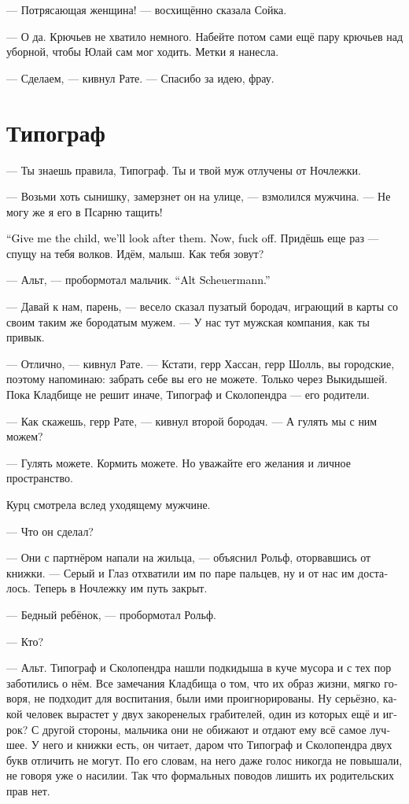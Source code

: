 \documentclass[a4paper,12pt,fleqn]{book}\usepackage{cooltooltips}\usepackage{polyglossia}\setdefaultlanguage[babelshorthands=true]{russian}\setotherlanguage{english}\defaultfontfeatures{Ligatures=TeX,Mapping=tex-text} \usepackage{xcolor}\definecolor{lightgray}{HTML}{bbbbbb}\color{lightgray}\newcommand{\ml}[3]{\textenglish{\textcolor{black}{#3}}}
\begin{document}
--- Потрясающая женщина! --- восхищённо сказала Сойка.

--- О да.
Крючьев не хватило немного.
Набейте потом сами ещё пару крючьев над уборной, чтобы Юлай сам мог ходить.
Метки я нанесла.

--- Сделаем, --- кивнул Рате.
--- Спасибо за идею, фрау.

\section{Типограф}

--- Ты знаешь правила, Типограф.
Ты и твой муж отлучены от Ночлежки.

--- Возьми хоть сынишку, замерзнет он на улице, --- взмолился мужчина.
--- Не могу же я его в Псарню тащить!

\ml{$0$}
{--- Ребёнка давай сюда, мы позаботимся.}
{``Give me the child, we'll look after them.}
\ml{$0$}
{А теперь вали отсюда.}
{Now, fuck off.}
Придёшь еще раз --- спущу на тебя волков.
Идём, малыш.
Как тебя зовут?

--- Альт, --- пробормотал мальчик.
\ml{$0$}
{--- Альт Шоэрманн.}
{``Alt Scheuermann.''}

--- Давай к нам, парень, --- весело сказал пузатый бородач, играющий в карты со своим таким же бородатым мужем.
--- У нас тут мужская компания, как ты привык.

--- Отлично, --- кивнул Рате.
--- Кстати, герр Хассан, герр Шолль, вы городские, поэтому напоминаю: забрать себе вы его не можете.
Только через Выкидышей.
Пока Кладбище не решит иначе, Типограф и Сколопендра --- его родители.

--- Как скажешь, герр Рате, --- кивнул второй бородач.
--- А гулять мы с ним можем?

--- Гулять можете.
Кормить можете.
Но уважайте его желания и личное пространство.

Курц смотрела вслед уходящему мужчине.

--- Что он сделал?

--- Они с партнёром напали на жильца, --- объяснил Рольф, оторвавшись от книжки.
--- Серый и Глаз отхватили им по паре пальцев, ну и от нас им досталось.
Теперь в Ночлежку им путь закрыт.

--- Бедный ребёнок, --- пробормотал Рольф.

--- Кто?

--- Альт.
Типограф и Сколопендра нашли подкидыша в куче мусора и с тех пор заботились о нём.
Все замечания Кладбища о том, что их образ жизни, мягко говоря, не подходит для воспитания, были ими проигнорированы.
Ну серьёзно, какой человек вырастет у двух закоренелых грабителей, один из которых ещё и игрок?
С другой стороны, мальчика они не обижают и отдают ему всё самое лучшее.
У него и книжки есть, он читает, даром что Типограф и Сколопендра двух букв отличить не могут.
По его словам, на него даже голос никогда не повышали, не говоря уже о насилии.
Так что формальных поводов лишить их родительских прав нет.
\end{document}
